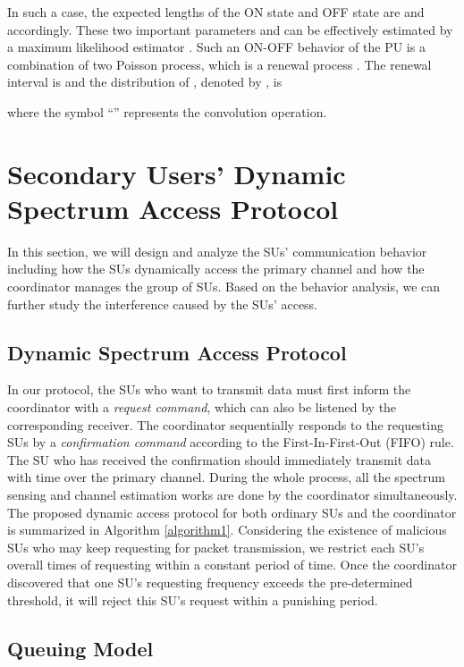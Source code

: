 \documentclass[11pt,draftcls]{IEEEtran}{\onecolumn}
\begin{document}
In such a case, the expected lengths of the ON state and OFF state are
 and  accordingly. These two important
parameters  and  can be effectively estimated
by a maximum likelihood estimator \cite{12}. Such an ON-OFF behavior
of the PU is a combination of two Poisson process, which is a
renewal process \cite{renew}. The renewal interval is
 and the distribution of ,
denoted by , is

where the symbol ``'' represents the convolution operation.

\section{Secondary Users' Dynamic Spectrum Access Protocol}\label{cases}

In this section, we will design and analyze the SUs' communication
behavior including how the SUs dynamically access the primary
channel and how the coordinator manages the group of SUs. Based on
the behavior analysis, we can further study the interference caused
by the SUs' access.

\subsection{Dynamic Spectrum Access Protocol}

In our protocol, the SUs who want to transmit data must first inform
the coordinator with a \emph{request command}, which can also be
listened by the corresponding receiver. The coordinator sequentially
responds to the requesting SUs by a \emph{confirmation command}
according to the First-In-First-Out (FIFO) rule. The SU who has
received the confirmation should immediately transmit data with time
 over the primary channel. During the whole process, all the
spectrum sensing and channel estimation works are done by the
coordinator simultaneously. The proposed dynamic access protocol for
both ordinary SUs and the coordinator is summarized in Algorithm
\ref{algorithm1}. Considering the existence of malicious SUs who may
keep requesting for packet transmission, we restrict each SU's
overall times of requesting within a constant period of time. Once
the coordinator discovered that one SU's requesting frequency
exceeds the pre-determined threshold, it will reject this SU's
request within a punishing period.

\subsection{Queuing Model}\label{queuing}
\end{document}
